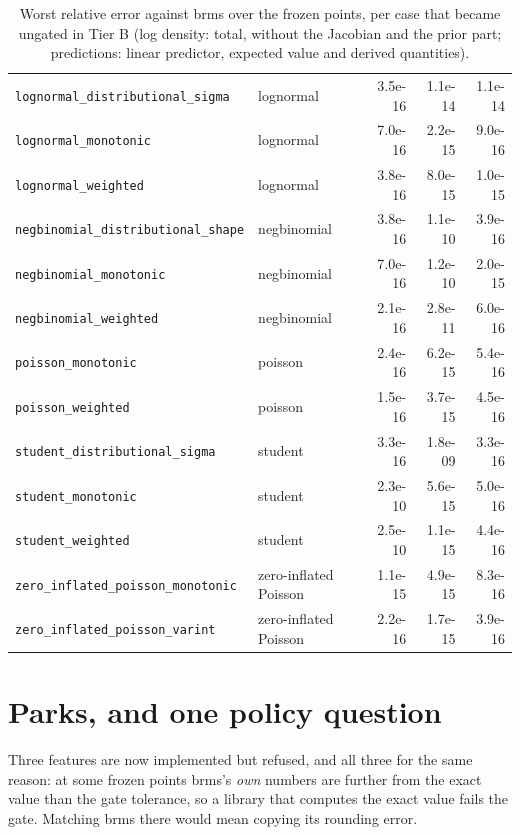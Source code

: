 \documentclass[11pt]{article}
\newcommand{\code}[1]{\texttt{#1}}
\begin{document}
\begin{table}[tbp]
\begin{center}
\begin{tabular}{@{}llrrr@{}}
\code{lognormal\_distributional\_sigma} & lognormal & 3.5e-16 & 1.1e-14 & 1.1e-14 \\
\code{lognormal\_monotonic} & lognormal & 7.0e-16 & 2.2e-15 & 9.0e-16 \\
\code{lognormal\_weighted} & lognormal & 3.8e-16 & 8.0e-15 & 1.0e-15 \\
\code{negbinomial\_distributional\_shape} & negbinomial & 3.8e-16 & 1.1e-10 & 3.9e-16 \\
\code{negbinomial\_monotonic} & negbinomial & 7.0e-16 & 1.2e-10 & 2.0e-15 \\
\code{negbinomial\_weighted} & negbinomial & 2.1e-16 & 2.8e-11 & 6.0e-16 \\
\code{poisson\_monotonic} & poisson & 2.4e-16 & 6.2e-15 & 5.4e-16 \\
\code{poisson\_weighted} & poisson & 1.5e-16 & 3.7e-15 & 4.5e-16 \\
\code{student\_distributional\_sigma} & student & 3.3e-16 & 1.8e-09 & 3.3e-16 \\
\code{student\_monotonic} & student & 2.3e-10 & 5.6e-15 & 5.0e-16 \\
\code{student\_weighted} & student & 2.5e-10 & 1.1e-15 & 4.4e-16 \\
\code{zero\_inflated\_poisson\_monotonic} & zero-inflated Poisson & 1.1e-15 & 4.9e-15 & 8.3e-16 \\
\code{zero\_inflated\_poisson\_varint} & zero-inflated Poisson & 2.2e-16 & 1.7e-15 & 3.9e-16 \\
\bottomrule
\end{tabular}\end{center}
\caption{\small Worst relative error against brms over the frozen points, per case that became ungated in Tier B (log density: total, without the Jacobian and the prior part; predictions: linear predictor, expected value and derived quantities).}\label{tab:margins}
\end{table}


\section{Parks, and one policy question}
\label{sec:parks}

Three features are now implemented but refused, and all three for the same reason: at some frozen points brms's
\emph{own} numbers are further from the exact value than the gate tolerance, so a library that computes the exact value
fails the gate. Matching brms there would mean copying its rounding error.
\end{document}
